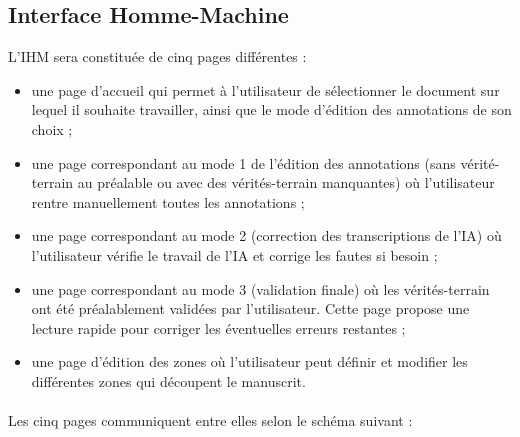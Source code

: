 \subsection{Interface Homme-Machine}

L’IHM sera constituée de cinq pages différentes :
\begin{itemize}
\item une page d’accueil qui permet à l’utilisateur de sélectionner le document
sur lequel il souhaite travailler, ainsi que le mode d’édition des annotations
de son choix ;
\item une page correspondant au mode 1 de l’édition des annotations
(sans vérité-terrain au préalable ou avec des vérités-terrain manquantes) où
l’utilisateur rentre manuellement toutes les annotations ;
\item une page correspondant au mode 2 (correction des transcriptions de l’IA)
où l’utilisateur vérifie le travail de l’IA et corrige les fautes si besoin ;
\item une page correspondant au mode 3 (validation finale) où les
vérités-terrain ont été préalablement validées par l’utilisateur. Cette page
propose une lecture rapide pour corriger les éventuelles erreurs restantes ;
\item une page d’édition des zones où l’utilisateur peut définir et modifier
les différentes zones qui découpent le manuscrit.
\end{itemize}

\paragraph{}
Les cinq pages communiquent entre elles selon le schéma suivant :

